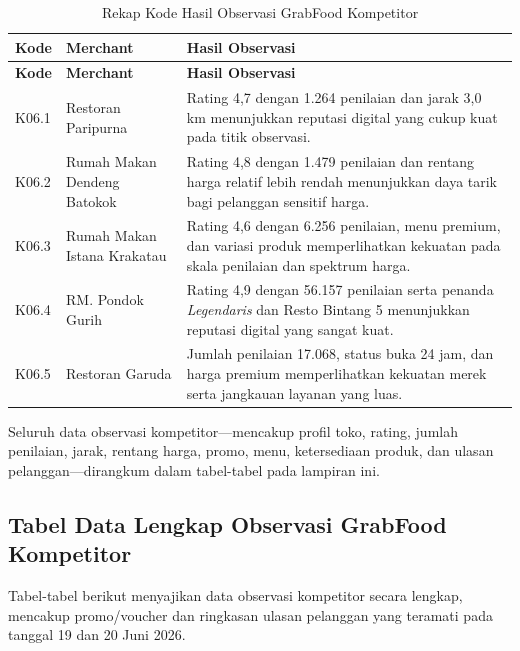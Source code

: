 \begingroup
\footnotesize
\begin{xltabular}{\textwidth}{|Z{1.35cm}|Z{3.0cm}|Y|}
\caption{Rekap Kode Hasil Observasi GrabFood Kompetitor}
\label{tab:kode-temuan-observasi-kompetitor-grabfood-20260619}
\label{tab:kode-hasil-observasi-kompetitor-grabfood-20260619} \\
        \toprule
        \textbf{Kode} & \textbf{Merchant} & \textbf{Hasil Observasi} \\ \hline
        \midrule
        \endfirsthead
        \toprule
        \textbf{Kode} & \textbf{Merchant} & \textbf{Hasil Observasi} \\ \hline
        \midrule
\endhead
{}
\endfoot
        \bottomrule
        \endlastfoot
        K06.1 & Restoran Paripurna & Rating 4,7 dengan 1.264 penilaian dan jarak 3,0 km menunjukkan reputasi digital yang cukup kuat pada titik observasi. \\ \hline
        K06.2 & Rumah Makan Dendeng Batokok & Rating 4,8 dengan 1.479 penilaian dan rentang harga relatif lebih rendah menunjukkan daya tarik bagi pelanggan sensitif harga. \\ \hline
        K06.3 & Rumah Makan Istana Krakatau & Rating 4,6 dengan 6.256 penilaian, menu premium, dan variasi produk memperlihatkan kekuatan pada skala penilaian dan spektrum harga. \\ \hline
        K06.4 & RM. Pondok Gurih & Rating 4,9 dengan 56.157 penilaian serta penanda \textit{Legendaris} dan Resto Bintang 5 menunjukkan reputasi digital yang sangat kuat. \\ \hline
        K06.5 & Restoran Garuda & Jumlah penilaian 17.068, status buka 24 jam, dan harga premium memperlihatkan kekuatan merek serta jangkauan layanan yang luas. \\ \hline
        \bottomrule
\end{xltabular}
\endgroup

Seluruh data observasi kompetitor---mencakup profil toko, rating, jumlah penilaian, jarak, rentang harga, promo, menu, ketersediaan produk, dan ulasan pelanggan---dirangkum dalam tabel-tabel pada lampiran ini.

\subsection*{Tabel Data Lengkap Observasi GrabFood Kompetitor}

Tabel-tabel berikut menyajikan data observasi kompetitor secara lengkap, mencakup promo/voucher dan ringkasan ulasan pelanggan yang teramati pada tanggal 19 dan 20 Juni 2026.




